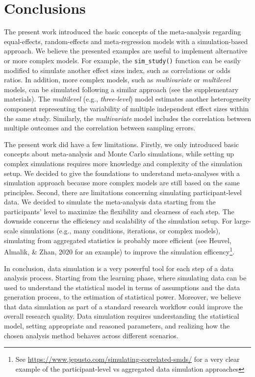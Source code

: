 \documentclass[
  man,floatsintext]{apa6}
\begin{document}
\normalsize

\section{Conclusions}\label{conclusions}

The present work introduced the basic concepts of the meta-analysis regarding equal-effects, random-effects and meta-regression models with a simulation-based approach. We believe the presented examples are useful to implement alternative or more complex models. For example, the \texttt{sim\_study()} function can be easily modified to simulate another effect sizes index, such as correlations or odds ratios. In addition, more complex models, such as \emph{multivariate} or \emph{multilevel} models, can be simulated following a similar approach (see the supplementary materials). The \emph{multilevel} (e.g., \emph{three-level}) model estimates another heterogeneity component representing the variability of multiple independent effect sizes within the same study. Similarly, the \emph{multivariate} model includes the correlation between multiple outcomes and the correlation between sampling errors.

The present work did have a few limitations. Firstly, we only introduced basic concepts about meta-analysis and Monte Carlo simulations, while setting up complex simulations requires more knowledge and complexity of the simulation setup. We decided to give the foundations to understand meta-analyses with a simulation approach because more complex models are still based on the same principles. Second, there are limitations concerning simulating participant-level data. We decided to simulate the meta-analysis data starting from the participants' level to maximize the flexibility and clearness of each step. The downside concerns the efficiency and scalability of the simulation setup. For large-scale simulations (e.g., many conditions, iterations, or complex models), simulating from aggregated statistics is probably more efficient (see Heuvel, Almalik, \& Zhan, 2020 for an example) to improve the simulation efficency\footnote{See \url{https://www.jepusto.com/simulating-correlated-smds/} for a very clear example of the participant-level vs aggregated data simulation approaches}.

In conclusion, data simulation is a very powerful tool for each step of a data analysis process. Starting from the learning phase, where simulating data can be used to understand the statistical model in terms of assumptions and the data generation process, to the estimation of statistical power. Moreover, we believe that data simulation as part of a standard research workflow could improve the overall research quality. Data simulation requires understanding the statistical model, setting appropriate and reasoned parameters, and realizing how the chosen analysis method behaves across different scenarios.
\end{document}
